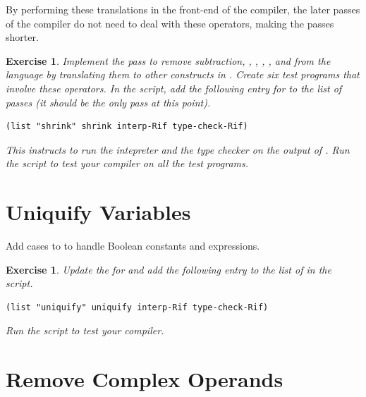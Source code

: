\documentclass[11pt]{book}
\newtheorem{exercise}[theorem]{Exercise}
\begin{document}
By performing these translations in the front-end of the compiler, the
later passes of the compiler do not need to deal with these operators,
making the passes shorter.


\begin{exercise}\normalfont
Implement the pass  to remove subtraction, ,
, \key{<=}, \key{>}, and \key{>=} from the language by
translating them to other constructs in \LangIf{}.
%
Create six test programs that involve these operators.
%
In the  script, add the following entry for
 to the list of passes (it should be the only pass at
this point).
\begin{lstlisting}
(list "shrink" shrink interp-Rif type-check-Rif)
\end{lstlisting}
This instructs  to run the intepreter
 and the type checker  on the
output of .
%
Run the script to test your compiler on all the test programs.

\end{exercise}

\section{Uniquify Variables}
\label{sec:uniquify-Rif}

Add cases to  to handle Boolean constants and
 expressions.

\begin{exercise}\normalfont
Update the  for \LangIf{} and add the following
entry to the list of  in the  script.
\begin{lstlisting}
(list "uniquify" uniquify interp-Rif type-check-Rif)
\end{lstlisting}
Run the script to test your compiler.
\end{exercise}

\section{Remove Complex Operands}
\label{sec:remove-complex-opera-Rif}
\end{document}
